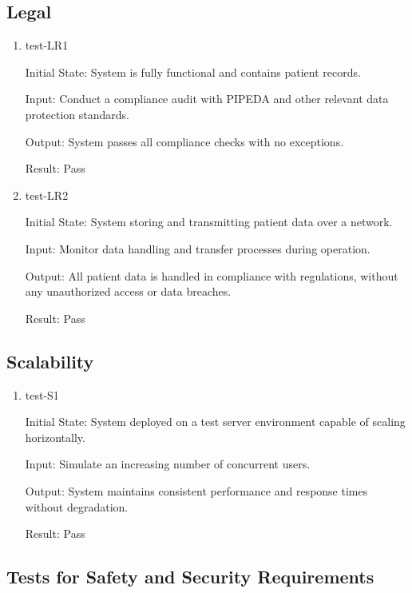 \documentclass[12pt, titlepage]{article}
\begin{document}
\subsection{Legal} \label{section:4.8}

\begin{enumerate}
\item test-LR1 \label{test-LR1}

Initial State: System is fully functional and contains patient records.

Input: Conduct a compliance audit with PIPEDA and other relevant data protection standards.

Output: System passes all compliance checks with no exceptions.

Result: Pass

\item test-LR2 \label{test-LR2}

Initial State: System storing and transmitting patient data over a network.

Input: Monitor data handling and transfer processes during operation.

Output: All patient data is handled in compliance with regulations, without any unauthorized access or data breaches.

Result: Pass

\end{enumerate}

\subsection{Scalability} \label{section:4.9}

\begin{enumerate}
\item test-S1 \label{test-S1}

Initial State: System deployed on a test server environment capable of scaling horizontally.

Input: Simulate an increasing number of concurrent users.

Output: System maintains consistent performance and response times without degradation.

Result: Pass

\end{enumerate}

\subsection{Tests for Safety and Security Requirements} \label{section:4.10}
\end{document}
